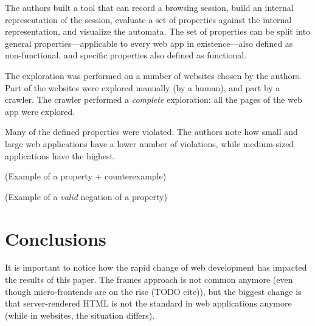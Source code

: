 \documentclass[a4paper,10pt]{article}
\theoremstyle{plain} %
\theoremstyle{definition}
\theoremstyle{remark}
\begin{document}
The authors built a tool that can record a browsing session, build an internal representation of the session, evaluate a set of properties against the internal representation, and visualize the automata. The set of properties can be split into general properties---applicable to every web app in existence---also defined as non-functional, and specific properties also defined as functional.

The exploration was performed on a number of websites chosen by the authors. Part of the websites were explored manually (by a human), and part by a crawler. The crawler performed a \emph{complete} exploration: all the pages of the web app were explored.

Many of the defined properties were violated. The authors note how small and large web applications have a lower number of violations, while medium-sized applications have the highest.

(Example of a property + counterexample)

(Example of a \textit{valid} negation of a property)

\section{Conclusions}

It is important to notice how the rapid change of web development has impacted the results of this paper. The frames approach is not common anymore (even though micro-frontends are on the rise (TODO cite)), but the biggest change is that server-rendered HTML is not the standard in web applications anymore (while in websites, the situation differs).


\clearpage
\printbibliography
\end{document}
